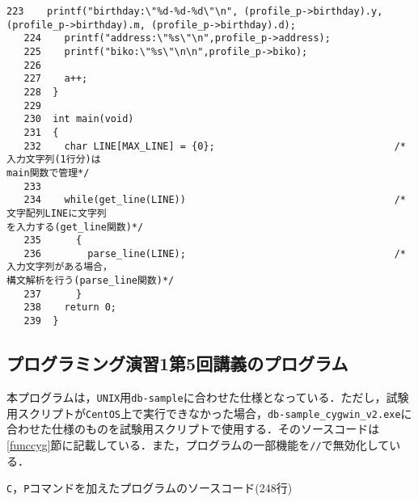 \begin{Verbatim}[fontsize=\small, baselinestretch=0.8]
   223	  printf("birthday:\"%d-%d-%d\"\n", (profile_p->birthday).y, 
(profile_p->birthday).m, (profile_p->birthday).d);
   224	  printf("address:\"%s\"\n",profile_p->address);
   225	  printf("biko:\"%s\"\n\n",profile_p->biko);
   226	
   227	  a++;
   228	}
   229	
   230	int main(void)
   231	{
   232	  char LINE[MAX_LINE] = {0};                               /*入力文字列(1行分)は
main関数で管理*/
   233	
   234	  while(get_line(LINE))                                    /*文字配列LINEに文字列
を入力する(get_line関数)*/
   235	    {
   236	      parse_line(LINE);                                    /*入力文字列がある場合，
構文解析を行う(parse_line関数)*/
   237	    }
   238	  return 0;
   239	}

\end{Verbatim}

\subsection{プログラミング演習1第5回講義のプログラム}\label{funcnow}

本プログラムは，\verb|UNIX|用\verb|db-sample|に合わせた仕様となっている．ただし，試験用スクリプトが\verb|CentOS|上で実行できなかった場合，\verb|db-sample_cygwin_v2.exe|に合わせた仕様のものを試験用スクリプトで使用する．そのソースコードは\ref{funccyg}節に記載している．また，プログラムの一部機能を\verb|//|で無効化している．

\verb|C|，\verb|P|コマンドを加えたプログラムのソースコード(248行)

